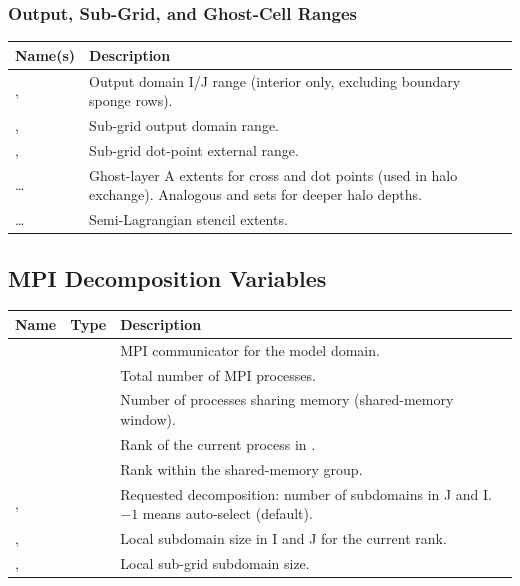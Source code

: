 \subsubsection{Output, Sub-Grid, and Ghost-Cell Ranges}

\begin{longtable}{L{4cm} L{8cm}}
  \toprule
  \textbf{Name(s)} & \textbf{Description} \\
  \midrule
  \endhead
  \bottomrule
  \endfoot
  ,  &
    Output domain I/J range (interior only, excluding boundary sponge rows). \\
  ,  &
    Sub-grid output domain range. \\
  ,  &
    Sub-grid dot-point external range. \\
  \ldots & Ghost-layer A extents for cross and dot points
    (used in halo exchange). Analogous  and  sets for
    deeper halo depths. \\
  \ldots & Semi-Lagrangian stencil extents. \\
\end{longtable}

\subsection{MPI Decomposition Variables}
\label{subsec:dynparam_mpi}

\begin{longtable}{L{4cm} L{3cm} L{7cm}}
  \toprule
  \textbf{Name} & \textbf{Type} & \textbf{Description} \\
  \midrule
  \endhead
  \bottomrule
  \endfoot
     &  &
    MPI communicator for the model domain. \\
      &  &
    Total number of MPI processes. \\
   &  &
    Number of processes sharing memory (shared-memory window). \\
       &  &
    Rank of the current process in . \\
    &  &
    Rank within the shared-memory group. \\
  ,  &  &
    Requested decomposition: number of subdomains in J and I. $-1$ means
    auto-select (default). \\
  ,  &  &
    Local subdomain size in I and J for the current rank. \\
  ,  &  &
    Local sub-grid subdomain size. \\
\end{longtable}


